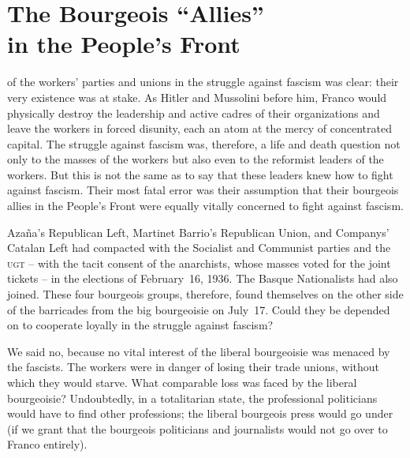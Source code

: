 \chapter[The Bourgeois “Allies” in the People's Front]{The Bourgeois “Allies” \\ in the People's Front}

 of the workers’ parties and unions in the struggle against fascism was clear: their very existence was at stake. As Hitler and Mussolini before him, Franco{\indexFFranco} would physically destroy the leadership and active cadres of their organizations and leave the workers in forced disunity, each an atom at the mercy of concentrated capital. The struggle against fascism was, therefore, a life and death question not only to the masses of the workers but also even to the reformist leaders of the workers. But this is not the same as to say that these leaders knew how to fight against fascism. Their most fatal error was their assumption that their bourgeois allies in the People’s Front were equally vitally concerned to fight against fascism.

\indexMAzana{}\indexLCompanys
Azaña's Republican Left, Martinet Barrio's Republican Union, and Companys' Catalan Left had compacted with the Socialist and Communist parties and the \textsc{ugt} -- with the tacit consent of the anarchists, whose masses voted for the joint tickets -- in the elections of February~16, 1936. The Basque Nationalists had also joined. These four bourgeois groups, therefore, found themselves on the other side of the barricades from the big bourgeoisie on July~17. Could they be depended on to cooperate loyally in the struggle against fascism?

We said no, because no vital interest of the liberal bourgeoisie was menaced by the fascists. The workers were in danger of losing their trade unions, without which they would starve. What comparable loss was faced by the liberal bourgeoisie? Undoubtedly, in a totalitarian state, the professional politicians would have to find other professions; the liberal bourgeois press would go under (if we grant that the bourgeois politicians and journalists would not go over to Franco entirely).

